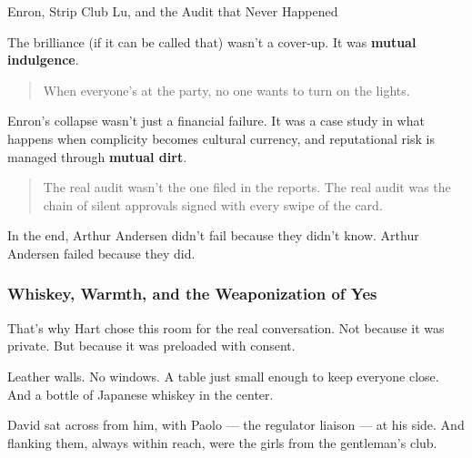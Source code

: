\begin{HistoricalSidebar}{Enron, Strip Club Lu, and the Audit that Never Happened}
  \medskip
  
  The brilliance (if it can be called that) wasn’t a cover-up. It was \textbf{mutual indulgence}.  
  
  \begin{quote}
  When everyone’s at the party, no one wants to turn on the lights.
  \end{quote}
  
  Enron’s collapse wasn’t just a financial failure. It was a case study in what happens when complicity becomes 
  cultural currency, and reputational risk is managed through \textbf{mutual dirt}.  
  
  \begin{quote}
  The real audit wasn’t the one filed in the reports.  
  The real audit was the chain of silent approvals signed with every swipe of the card.
  \end{quote}
  
  In the end, Arthur Andersen didn’t fail because they didn’t know.  Arthur Andersen failed because they did.
  
\end{HistoricalSidebar}

\medskip

\subsubsection{Whiskey, Warmth, and the Weaponization of Yes}

That’s why Hart chose this room for the real conversation.  
Not because it was private.  
But because it was preloaded with consent.

Leather walls. No windows. A table just small enough to keep everyone close.  
And a bottle of Japanese whiskey in the center.

David sat across from him, with Paolo — the regulator liaison — at his side.  
And flanking them, always within reach, were the girls from the gentleman's club.

\medskip

